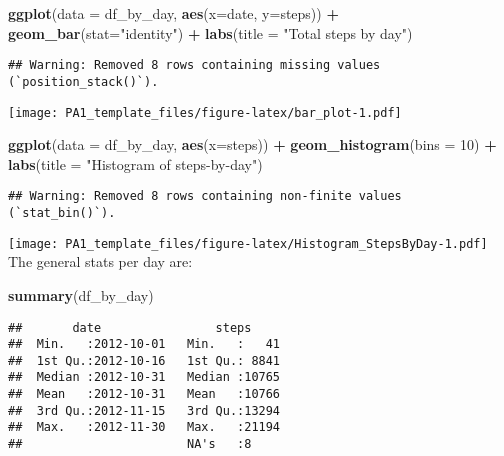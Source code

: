 \documentclass[
]{article}
\newenvironment{Shaded}{\begin{snugshade}}{\end{snugshade}}
\newcommand{\AttributeTok}[1]{\textcolor[rgb]{0.13,0.29,0.53}{#1}}
\newcommand{\DecValTok}[1]{\textcolor[rgb]{0.00,0.00,0.81}{#1}}
\newcommand{\FunctionTok}[1]{\textcolor[rgb]{0.13,0.29,0.53}{\textbf{#1}}}
\newcommand{\NormalTok}[1]{#1}
\newcommand{\SpecialCharTok}[1]{\textcolor[rgb]{0.81,0.36,0.00}{\textbf{#1}}}
\newcommand{\StringTok}[1]{\textcolor[rgb]{0.31,0.60,0.02}{#1}}
\begin{document}
\begin{Shaded}
\begin{Highlighting}[]
\FunctionTok{ggplot}\NormalTok{(}\AttributeTok{data =}\NormalTok{ df\_by\_day, }\FunctionTok{aes}\NormalTok{(}\AttributeTok{x=}\NormalTok{date, }\AttributeTok{y=}\NormalTok{steps)) }\SpecialCharTok{+}
  \FunctionTok{geom\_bar}\NormalTok{(}\AttributeTok{stat=}\StringTok{"identity"}\NormalTok{) }\SpecialCharTok{+}
  \FunctionTok{labs}\NormalTok{(}\AttributeTok{title =} \StringTok{"Total steps by day"}\NormalTok{)}
\end{Highlighting}
\end{Shaded}

\begin{verbatim}
## Warning: Removed 8 rows containing missing values (`position_stack()`).
\end{verbatim}

\texttt{[image: PA1\_template\_files/figure-latex/bar\_plot-1.pdf]}

\begin{Shaded}
\begin{Highlighting}[]
\FunctionTok{ggplot}\NormalTok{(}\AttributeTok{data =}\NormalTok{ df\_by\_day, }\FunctionTok{aes}\NormalTok{(}\AttributeTok{x=}\NormalTok{steps)) }\SpecialCharTok{+}
  \FunctionTok{geom\_histogram}\NormalTok{(}\AttributeTok{bins =} \DecValTok{10}\NormalTok{) }\SpecialCharTok{+}
  \FunctionTok{labs}\NormalTok{(}\AttributeTok{title =} \StringTok{"Histogram of steps{-}by{-}day"}\NormalTok{)}
\end{Highlighting}
\end{Shaded}

\begin{verbatim}
## Warning: Removed 8 rows containing non-finite values (`stat_bin()`).
\end{verbatim}

\texttt{[image: PA1\_template\_files/figure-latex/Histogram\_StepsByDay-1.pdf]}
The general stats per day are:

\begin{Shaded}
\begin{Highlighting}[]
\FunctionTok{summary}\NormalTok{(df\_by\_day)}
\end{Highlighting}
\end{Shaded}

\begin{verbatim}
##       date                steps      
##  Min.   :2012-10-01   Min.   :   41  
##  1st Qu.:2012-10-16   1st Qu.: 8841  
##  Median :2012-10-31   Median :10765  
##  Mean   :2012-10-31   Mean   :10766  
##  3rd Qu.:2012-11-15   3rd Qu.:13294  
##  Max.   :2012-11-30   Max.   :21194  
##                       NA's   :8
\end{verbatim}
\end{document}
